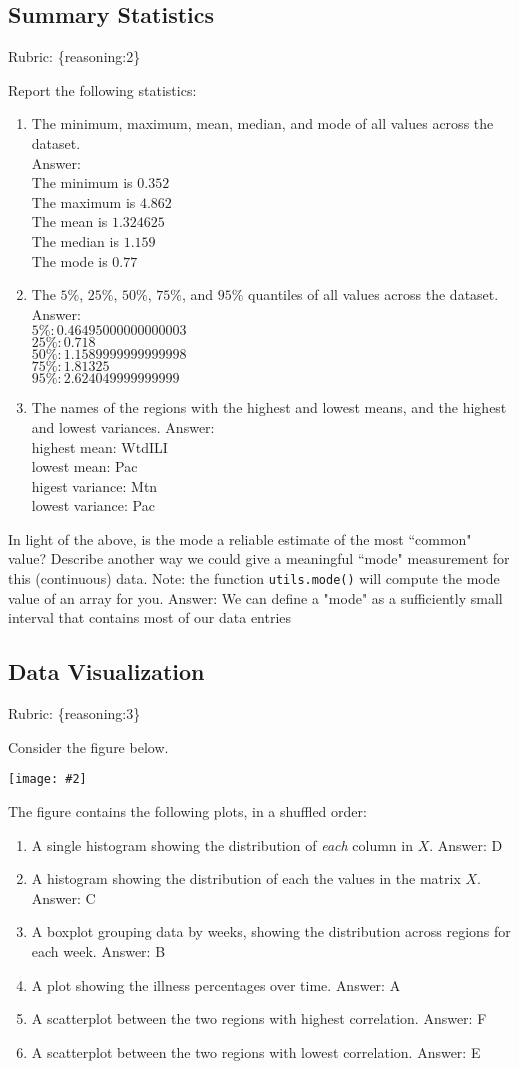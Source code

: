 \documentclass{article}
\def\rubric#1{\gre{Rubric: \{#1\}}}{}
\def\blu#1{{\color{blu}#1}}
\def\gre#1{{\color{gre}#1}}
\newcommand{\fig}[2]{\texttt{[image: \#2]}}
\def\enum#1{\begin{enumerate}#1\end{enumerate}}
\def\ans#1{\gre{Answer: #1}}{}
\begin{document}
\subsection{Summary Statistics}
\rubric{reasoning:2}

\blu{Report the following statistics}:
\enum{
\item The minimum, maximum, mean, median, and mode of all values across the dataset. \\
\ans{\\ The minimum is $0.352$ \\ The maximum is $4.862$ \\ The mean is $1.324625$ \\ The median is $1.159$ \\ The mode is $0.77$}
\item The $5\%$, $25\%$, $50\%$, $75\%$, and $95\%$ quantiles of all values across the dataset. \\
\ans{\\ $5\%: 0.46495000000000003$ 
	\\ $25 \%: 0.718$ 
	\\ $50 \%: 1.1589999999999998$
	\\ $75 \%: 1.81325$
	\\ $95 \%: 2.624049999999999$}
\item The names of the regions with the highest and lowest means, and the highest and lowest variances.
\ans{\\ highest mean: WtdILI
	\\ lowest mean: Pac
	\\ higest variance: Mtn
	\\ lowest variance: Pac} 
}
In light of the above, \blu{is the mode a reliable estimate of the most ``common" value? Describe another way we could give a meaningful ``mode" measurement for this (continuous) data.} Note: the function \texttt{utils.mode()} will compute the mode value of an array for you.
\ans{We can define a "mode" as a sufficiently small interval that contains most of our data entries}


\subsection{Data Visualization}
\rubric{reasoning:3}

Consider the figure below.

\fig{1}{../figs/visualize-unlabeled}

The figure contains the following plots, in a shuffled order:
\enum{
\item A single histogram showing the distribution of \emph{each} column in $X$. \ans{D}
\item A histogram showing the distribution of each the values in the matrix $X$. \ans{C}
\item A boxplot grouping data by weeks, showing the distribution across regions for each week. \ans{B}
\item A plot showing the illness percentages over time. \ans{A}
\item A scatterplot between the two regions with highest correlation. \ans{F}
\item A scatterplot between the two regions with lowest correlation. \ans{E}
}
\end{document}
